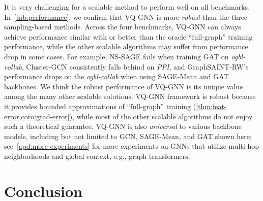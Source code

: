 \documentclass{article}
\renewcommand{\emph}[1]{\textit{#1}}
\begin{document}
It is very challenging for a scalable method to perform well on all benchmarks. In~\cref{tab:performance}, we confirm that VQ-GNN is more \emph{robust} than the three sampling-based methods. Across the four benchmarks, VQ-GNN can always achieve performance similar with or better than the oracle ``full-graph'' training performance, while the other scalable algorithms may suffer from performance drop in some cases. For example, NS-SAGE fails when training GAT on \textit{ogbl-collab}, Cluster-GCN consistently falls behind on \textit{PPI}, and GraphSAINT-RW's performance drops on the \textit{ogbl-collab} when using SAGE-Mean and GAT backbones. We think the robust performance of VQ-GNN is its unique value among the many other scalable solutions. VQ-GNN framework is robust because it provides bounded approximations of ``full-graph'' training (\cref{thm:feat-error,coro:grad-error}), while most of the other scalable algorithms do not enjoy such a theoretical guarantee. VQ-GNN is also \emph{universal} to various backbone models, including but not limited to GCN, SAGE-Mean, and GAT shown here; see~\cref{apd:more-experiments} for more experiments on GNNs that utilize multi-hop neighborhoods and global context, e.g., graph transformers.

%
 \section{Conclusion}
\label{sec:conclusion}
\end{document}
